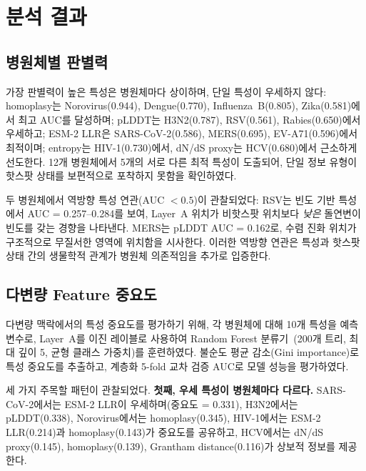 \section{분석 결과}
\label{sec:adapt_analysis}

\subsection{병원체별 판별력}
\label{subsec:per_pathogen_disc}

가장 판별력이 높은 특성은 병원체마다 상이하며, 단일 특성이 우세하지 않다: homoplasy는 Norovirus(0.944), Dengue(0.770), Influenza~B(0.805), Zika(0.581)에서 최고 AUC를 달성하며; pLDDT는 H3N2(0.787), RSV(0.561), Rabies(0.650)에서 우세하고; ESM-2 LLR은 SARS-CoV-2(0.586), MERS(0.695), EV-A71(0.596)에서 최적이며; entropy는 HIV-1(0.730)에서, dN/dS proxy는 HCV(0.680)에서 근소하게 선도한다.
12개 병원체에서 5개의 서로 다른 최적 특성이 도출되어, 단일 정보 유형이 핫스팟 상태를 보편적으로 포착하지 못함을 확인하였다.

두 병원체에서 역방향 특성 연관(AUC $< 0.5$)이 관찰되었다: RSV는 빈도 기반 특성에서 AUC = 0.257--0.284를 보여, Layer~A 위치가 비핫스팟 위치보다 \textit{낮은} 돌연변이 빈도를 갖는 경향을 나타낸다.
MERS는 pLDDT AUC = 0.162로, 수렴 진화 위치가 구조적으로 무질서한 영역에 위치함을 시사한다.
이러한 역방향 연관은 특성과 핫스팟 상태 간의 생물학적 관계가 병원체 의존적임을 추가로 입증한다.

\subsection{다변량 Feature 중요도}
\label{subsec:rf_importance_adapt}

다변량 맥락에서의 특성 중요도를 평가하기 위해, 각 병원체에 대해 10개 특성을 예측 변수로, Layer~A를 이진 레이블로 사용하여 Random Forest 분류기~\cite{breiman2001random}(200개 트리, 최대 깊이 5, 균형 클래스 가중치)를 훈련하였다.
불순도 평균 감소(Gini importance)로 특성 중요도를 추출하고, 계층화 5-fold 교차 검증 AUC로 모델 성능을 평가하였다.

세 가지 주목할 패턴이 관찰되었다.
\textbf{첫째, 우세 특성이 병원체마다 다르다.}
SARS-CoV-2에서는 ESM-2 LLR이 우세하며(중요도 = 0.331), H3N2에서는 pLDDT(0.338), Norovirus에서는 homoplasy(0.345), HIV-1에서는 ESM-2 LLR(0.214)과 homoplasy(0.143)가 중요도를 공유하고, HCV에서는 dN/dS proxy(0.145), homoplasy(0.139), Grantham distance(0.116)가 상보적 정보를 제공한다.


